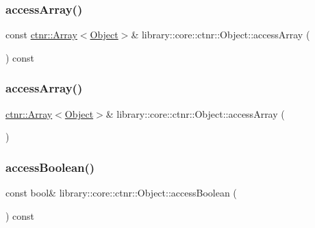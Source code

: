 \subsubsection{\texorpdfstring{access\+Array()}{accessArray()}\hspace{0.1cm}{\footnotesize\ttfamily [1/2]}}
{\footnotesize\ttfamily const \hyperlink{classlibrary_1_1core_1_1ctnr_1_1Array}{ctnr\+::\+Array}$<$\hyperlink{classlibrary_1_1core_1_1ctnr_1_1Object}{Object}$>$\& library\+::core\+::ctnr\+::\+Object\+::access\+Array (\begin{DoxyParamCaption}{ }\end{DoxyParamCaption}) const}

\mbox{\label{classlibrary_1_1core_1_1ctnr_1_1Object_af4d1752c7624a8a9b7005d2b14dd1898}} 
\subsubsection{\texorpdfstring{access\+Array()}{accessArray()}\hspace{0.1cm}{\footnotesize\ttfamily [2/2]}}
{\footnotesize\ttfamily \hyperlink{classlibrary_1_1core_1_1ctnr_1_1Array}{ctnr\+::\+Array}$<$\hyperlink{classlibrary_1_1core_1_1ctnr_1_1Object}{Object}$>$\& library\+::core\+::ctnr\+::\+Object\+::access\+Array (\begin{DoxyParamCaption}{ }\end{DoxyParamCaption})}

\mbox{\label{classlibrary_1_1core_1_1ctnr_1_1Object_a0624bcf2292bb76848f3c284eb537d88}} 
\subsubsection{\texorpdfstring{access\+Boolean()}{accessBoolean()}\hspace{0.1cm}{\footnotesize\ttfamily [1/2]}}
{\footnotesize\ttfamily const bool\& library\+::core\+::ctnr\+::\+Object\+::access\+Boolean (\begin{DoxyParamCaption}{ }\end{DoxyParamCaption}) const}

